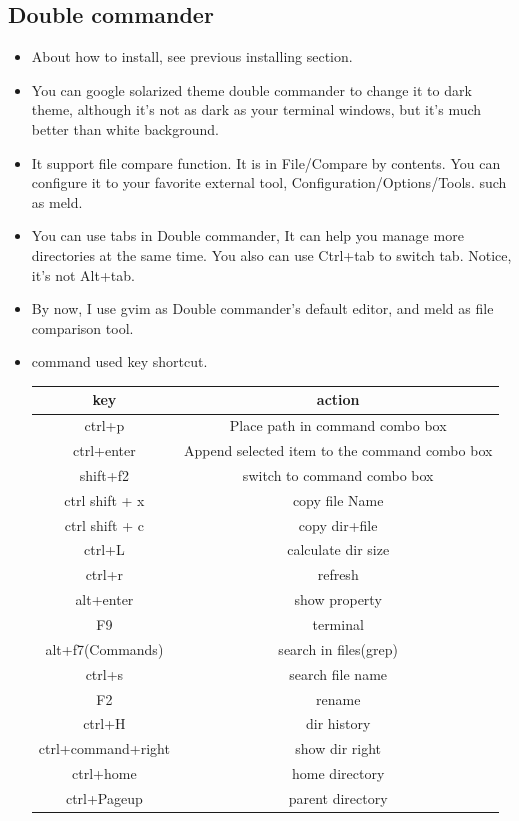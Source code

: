 \documentclass[a4paper,11pt,twoside]{book}
\begin{document}
\subsection{Double commander}
\begin{itemize}
		\item About how to install, see previous installing section.

		\item You can google solarized theme double commander to change it to dark theme, although it's not as dark as your terminal windows, but it's much better than white background. 

		\item It support file compare function. It is in File/Compare by contents.  You can configure it to your favorite external tool, Configuration/Options/Tools. such as meld. 

		\item You can use tabs in Double commander, It can help you manage more directories at the same time. You also can use Ctrl+tab to switch tab. Notice, it's not Alt+tab. 

		\item By now, I use gvim as Double commander's default editor, and meld as file comparison tool. 

		\item command used key shortcut.\\			

\begin{tabular}{|c|c|}
\hline 
\textbf{key} & \textbf{action} \\ 
\hline 
ctrl+p & Place path in command combo box   \\ 
\hline 
ctrl+enter  & Append selected item to the command combo box \\ 
\hline 
shift+f2  & switch to command combo box \\ 

\hline 
ctrl shift + x & copy file Name \\ 
\hline 
ctrl shift + c & copy dir+file \\ 

\hline \hline  
ctrl+L & calculate dir size  \\ 
\hline 
ctrl+r & refresh  \\ 
\hline 
alt+enter & show property \\ 

\hline 
F9 & terminal  \\ 

\hline 
 alt+f7(Commands) & search in files(grep) \\ 
\hline 
ctrl+s  & search file name \\ 
\hline 
F2  & rename \\ 
\hline
ctrl+H  & dir history \\ 

\hline 
ctrl+command+right  & show dir right  \\ 
\hline 
ctrl+home  & home directory \\ 
\hline 
ctrl+Pageup  & parent directory  \\ 
\hline 
 
\end{tabular} 
\end{itemize}
\end{document}
